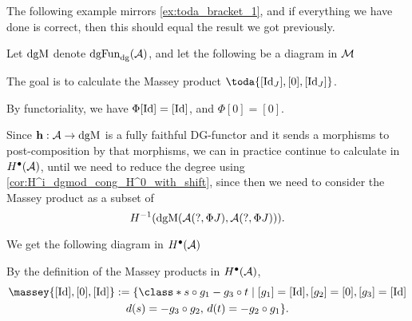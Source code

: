 The following example mirrors \autoref{ex:toda_bracket_1}, and if everything we have done is correct, then this should equal the result we got previously.

\begin{example}
    \label{ex:massey_product_1}
    Let \( \operatorname{dgM} \) denote \( \operatorname{dgFun}_{\operatorname{dg}}({\mathcal{A}}) \), and let the following be a diagram in \( {\mathcal{M}} \)
	\begin{center}
	\end{center}
	
	The goal is to calculate the Massey product \( \toda{[\Id_J], [0], [\Id_J]} \).

    By functoriality, we have \( \Phi [\operatorname{Id}] = [\operatorname{Id}] \), and \( \Phi [0] = [0] \).

    Since \( \mathbf{h}: {\mathcal{A}} \to \operatorname{dgM} \) is a fully faithful DG-functor and it sends a morphisms to post-composition by that morphisms, we can in practice continue to calculate in \( H^{\bullet}({\mathcal{A}}) \), until we need to reduce the degree using \autoref{cor:H^i_dgmod_cong_H^0_with_shift}, since then we need to consider the Massey product as a subset of
    \[
        H^{-1}(\operatorname{dgM}({\mathcal{A}}(?, \Phi J), {\mathcal{A}}(?, \Phi J))).
    \]

    We get the following diagram in \( H^{\bullet}({\mathcal{A}}) \)
    \begin{center}
	\end{center}

    By the definition of the Massey products in \( H^\bullet({\mathcal{A}}) \),
    \begin{multline*}
        \massey{[\Id], [0], [\Id]} :=
        \{
            \class*{
                s \circ g_1 - g_3 \circ t
            }
            \mid [g_1] = [\Id], [g_2] = [0], [g_3] = [\Id] \\
            d(s) = - g_3 \circ g_2, \,
            d(t) = - g_2 \circ g_1
        \}.
    \end{multline*}


\end{example}
